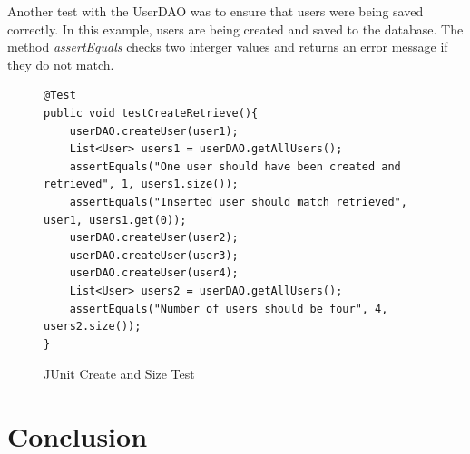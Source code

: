 Another test with the UserDAO was to ensure that users were being saved correctly. In this example, users are being created and saved to the database. The method \textit{assertEquals} checks two interger values and returns an error message if they do not match.

\begin{figure}[H]
\begin{lstlisting}
@Test 
public void testCreateRetrieve(){
	userDAO.createUser(user1);
	List<User> users1 = userDAO.getAllUsers();
	assertEquals("One user should have been created and retrieved", 1, users1.size());
	assertEquals("Inserted user should match retrieved", user1, users1.get(0));
	userDAO.createUser(user2);
	userDAO.createUser(user3);
	userDAO.createUser(user4);
	List<User> users2 = userDAO.getAllUsers();
	assertEquals("Number of users should be four", 4, users2.size());
}
\end{lstlisting}
\caption{JUnit Create and Size Test}
\end{figure}


\section{Conclusion}
